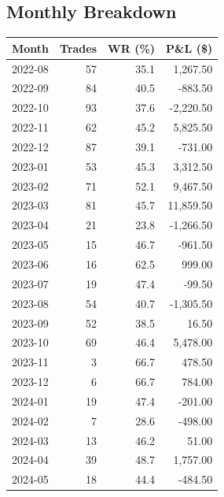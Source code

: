 \documentclass[11pt,a4paper]{article}
\begin{document}
\subsection*{Monthly Breakdown}
\noindent\begin{center}
\begin{tabular}{>{\color{txtmain}}l rrr}
\toprule
\rowcolor{cardbg}
\textbf{Month} & \textbf{Trades} & \textbf{WR (\%)} & \textbf{P\&L (\$)} \\
\midrule
2022-08 & 57 & 35.1 & \textcolor{wingreen}{1,267.50} \\
2022-09 & 84 & 40.5 & \textcolor{lossred}{-883.50} \\
2022-10 & 93 & 37.6 & \textcolor{lossred}{-2,220.50} \\
2022-11 & 62 & 45.2 & \textcolor{wingreen}{5,825.50} \\
2022-12 & 87 & 39.1 & \textcolor{lossred}{-731.00} \\
2023-01 & 53 & 45.3 & \textcolor{wingreen}{3,312.50} \\
2023-02 & 71 & 52.1 & \textcolor{wingreen}{9,467.50} \\
2023-03 & 81 & 45.7 & \textcolor{wingreen}{11,859.50} \\
2023-04 & 21 & 23.8 & \textcolor{lossred}{-1,266.50} \\
2023-05 & 15 & 46.7 & \textcolor{lossred}{-961.50} \\
2023-06 & 16 & 62.5 & \textcolor{wingreen}{999.00} \\
2023-07 & 19 & 47.4 & \textcolor{lossred}{-99.50} \\
2023-08 & 54 & 40.7 & \textcolor{lossred}{-1,305.50} \\
2023-09 & 52 & 38.5 & \textcolor{wingreen}{16.50} \\
2023-10 & 69 & 46.4 & \textcolor{wingreen}{5,478.00} \\
2023-11 & 3 & 66.7 & \textcolor{wingreen}{478.50} \\
2023-12 & 6 & 66.7 & \textcolor{wingreen}{784.00} \\
2024-01 & 19 & 47.4 & \textcolor{lossred}{-201.00} \\
2024-02 & 7 & 28.6 & \textcolor{lossred}{-498.00} \\
2024-03 & 13 & 46.2 & \textcolor{wingreen}{51.00} \\
2024-04 & 39 & 48.7 & \textcolor{wingreen}{1,757.00} \\
2024-05 & 18 & 44.4 & \textcolor{lossred}{-484.50} \\

\end{tabular}
\end{center}
\end{document}
